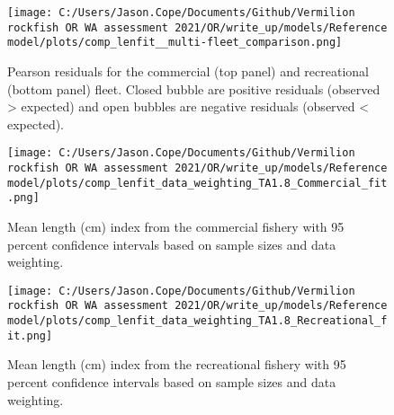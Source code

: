 \documentclass[11pt,
  english,
  a4paper,
]{article}
\begin{document}
\tagmcend\tagstructend


\begin{figure}
\centering
\texttt{[image: C:/Users/Jason.Cope/Documents/Github/Vermilion rockfish OR WA assessment 2021/OR/write\_up/models/Reference model/plots/comp\_lenfit\_\_multi-fleet\_comparison.png]}
\caption{Pearson residuals for the commercial (top panel) and recreational (bottom panel) fleet. Closed bubble are positive residuals (observed \textgreater{} expected) and open bubbles are negative residuals (observed \textless{} expected).\label{fig:com-rec-pearson}}
\end{figure}

\tagmcend\tagstructend


\begin{figure}
\centering
\texttt{[image: C:/Users/Jason.Cope/Documents/Github/Vermilion rockfish OR WA assessment 2021/OR/write\_up/models/Reference model/plots/comp\_lenfit\_data\_weighting\_TA1.8\_Commercial\_fit.png]}
\caption{Mean length (cm) index from the commercial fishery with 95 percent confidence intervals based on sample sizes and data weighting.\label{fig:com-mean-len-fit}}
\end{figure}

\tagmcend\tagstructend


\begin{figure}
\centering
\texttt{[image: C:/Users/Jason.Cope/Documents/Github/Vermilion rockfish OR WA assessment 2021/OR/write\_up/models/Reference model/plots/comp\_lenfit\_data\_weighting\_TA1.8\_Recreational\_fit.png]}
\caption{Mean length (cm) index from the recreational fishery with 95 percent confidence intervals based on sample sizes and data weighting.\label{fig:rec-mean-len-fit}}
\end{figure}
\end{document}
